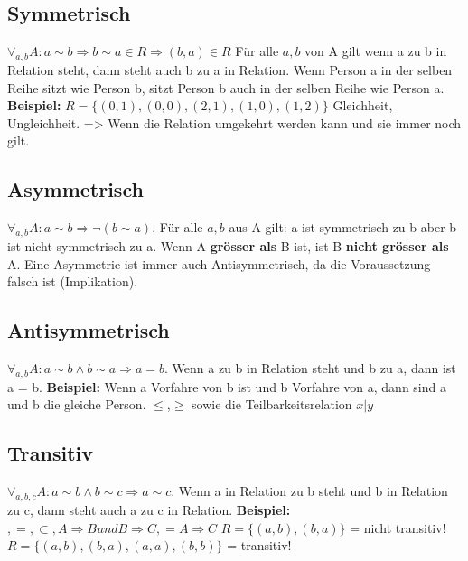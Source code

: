 \documentclass[a4paper,DIV10,12pt,headsepline,smallheadings,halfparskip-]{scrreprt}
\begin{document}
	\subsection{Symmetrisch}
	\( \forall_{a,b} A: a \sim b \Rightarrow b \sim a \in R \Rightarrow (b,a) \in R \) \newline
	Für alle \(a,b\) von A gilt wenn a zu b in Relation steht, dann steht auch b zu a in Relation. \newline
	Wenn Person a in der selben Reihe sitzt wie Person b, sitzt Person b auch in der selben Reihe wie Person a.
	\textbf{Beispiel:} \( R = \{(0,1),(0,0),(2,1),(1,0),(1,2) \} \)
        \newline Gleichheit, Ungleichheit.
		=> Wenn die Relation umgekehrt werden kann und sie immer noch gilt.
		
	\subsection{Asymmetrisch}
	\( \forall_{a,b} A: a \sim b \Rightarrow \neg (b \sim a) \). Für alle
        \(a,b\) aus A gilt: a ist symmetrisch zu b aber b ist nicht symmetrisch zu a.
        Wenn A \textbf{grösser als} B ist, ist B \textbf{nicht grösser als} A. Eine Asymmetrie
        ist immer auch Antisymmetrisch, da die Voraussetzung falsch ist
        (Implikation).

	\subsection{Antisymmetrisch}
	\(\forall_{a,b} A: a \sim b \wedge b \sim a \Rightarrow a = b \). Wenn a zu b in Relation steht und b zu a, dann ist a = b.\newline
	\textbf{Beispiel:} Wenn a Vorfahre von b ist und b Vorfahre von a, dann
        sind a und b die gleiche Person.\newline
        \(\leq\),\(\geq\) sowie die Teilbarkeitsrelation \(x | y\)

	\subsection{Transitiv}
	\( \forall_{a,b,c} A: a \sim b \wedge b \sim c \Rightarrow a \sim c \).
        Wenn a in Relation zu b steht und b in Relation zu c, dann steht auch a
        zu c in Relation.\newline
        \textbf{Beispiel:} \(<,>,=,\subset, A \Rightarrow B und B \Rightarrow
        C, = A \Rightarrow C\)\newline
        \( R = \{(a,b),(b,a) \}\) = nicht transitiv! \newline
        \( R = \{(a,b),(b,a),(a,a),(b,b) \}\) = transitiv!
\end{document}
